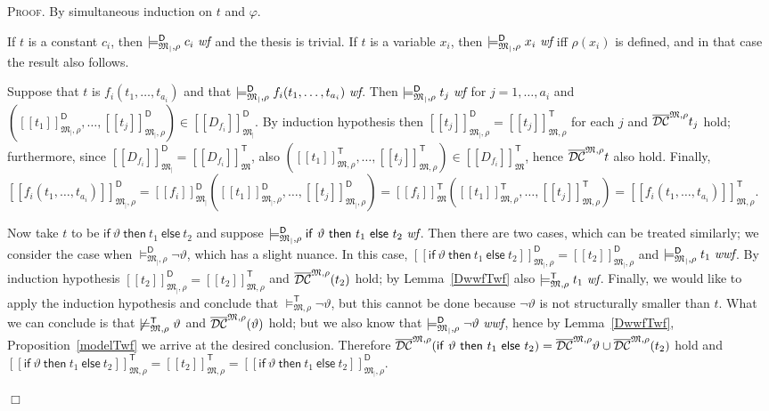 \documentclass{article}
\newenvironment{proof}{\smallskip\textsc{Proof.}}{\hspace*{\fill}$\Box$}
\newcommand{\ifthelse}[3]{\ensuremath{\mathsf{if}\ {#1}\ \mathsf{then}\ {#2}\ \mathsf{else}\ {#3}}}
\newcommand{\restrfun}[1]{\ensuremath{{#1}_|}}
\newcommand{\wf}{\ \mbox{\em wf}}
\newcommand{\wwf}{\ \mbox{\em wwf}}
\newcommand{\intm}[3]{\ensuremath{[\![{#3}]\!]^{\mathsf{#1}}_{\mathfrak{#2}}}}
\newcommand{\ints}[4]{\ensuremath{[\![{#4}]\!]^{\mathsf{#1}}_{\mathfrak{#2},{#3}}}}
\newcommand{\mymodelss}[3]{\ensuremath{\models_{\mathfrak{#2},{#3}}^{\mathsf{#1}}}}
\newcommand{\semDC}[2][{\mathfrak M},\rho]{\ensuremath{\overline{\cal{DC}}^{#1}_{#2}}}
\begin{document}
\begin{proof}
By simultaneous induction on $t$ and $\varphi$.

If $t$ is a constant $c_i$, then $\mymodelss{D}{\restrfun M}\rho{c_i}\wf$
and the thesis is trivial.
If $t$ is a variable $x_i$, then $\mymodelss{D}{\restrfun M}\rho{x_i}\wf$
iff $\rho(x_i)$ is defined, and in that case the result also follows.

Suppose that $t$ is $f_i(t_1,\ldots,t_{a_i})$ and that
$\mymodelss{D}{\restrfun M}\rho{f_i(t_1,\ldots,t_{a_i})}\wf$.  Then
$\mymodelss{D}{\restrfun M}\rho{t_j}\wf$ for $j=1,\ldots,a_i$ and
$(\ints{D}{\restrfun M}\rho{t_1},\ldots,\ints{D}{\restrfun M}\rho{t_j})%
\in\intm{D}{\restrfun M}{D_{f_i}}$.
By induction hypothesis then
$\ints{D}{\restrfun M}\rho{t_j}=\ints{T}M\rho{t_j}$ for each $j$
and $\semDC{}{t_j}$ hold; furthermore, since
$\intm{D}{\restrfun M}{D_{f_i}}=\intm{T}M{D_{f_i}}$, also
$(\ints{T}M\rho{t_1},\ldots,\ints{T}M\rho{t_j})\in\intm{T}M{D_{f_i}}$,
hence $\semDC{}{t}$ also hold.  Finally,
$\ints{D}{\restrfun M}\rho{f_i(t_1,\ldots,t_{a_i})}=%
\intm{D}{\restrfun M}{f_i}(\ints{D}{\restrfun M}\rho{t_1},\ldots,\ints{D}{\restrfun M}\rho{t_j})=%
\intm{T}M{f_i}(\ints{T}M\rho{t_1},\ldots,\ints{T}M\rho{t_j})=%
\ints{T}M\rho{f_i(t_1,\ldots,t_{a_i})}$.

Now take $t$ to be $\ifthelse\vartheta{t_1}{t_2}$ and suppose
$\mymodelss{D}{\restrfun M}\rho{\ifthelse\vartheta{t_1}{t_2}}\wf$.
Then there are two cases, which can be treated similarly; we consider
the case when $\mymodelss{D}{\restrfun M}\rho\neg\vartheta$, which has
a slight nuance.  In this case,
$\ints{D}{\restrfun M}\rho{\ifthelse\vartheta{t_1}{t_2}}=\ints{D}{\restrfun M}\rho{t_2}$
and $\mymodelss{D}{\restrfun M}\rho t_1\wwf$.
By induction hypothesis $\ints{D}{\restrfun M}\rho{t_2}=\ints{T}M\rho{t_2}$
and $\semDC{}(t_2)$ hold; by Lemma~\ref{DwwfTwf} also
$\mymodelss{T}M\rho t_1\wf$.
Finally, we would like to apply the induction hypothesis and conclude
that $\mymodelss{T}M\rho\neg\vartheta$, but this cannot be done
because $\neg\vartheta$ is not structurally smaller than $t$.  What we
can conclude is that $\not\mymodelss{T}M\rho\vartheta$ and
$\semDC{}(\vartheta)$ hold; but we also know that
$\mymodelss{D}{\restrfun M}\rho\neg\vartheta\wwf$, hence by
Lemma~\ref{DwwfTwf}, Proposition~\ref{modelTwf} we arrive at the
desired conclusion.
Therefore $\semDC{}(\ifthelse\vartheta{t_1}{t_2})=%
\semDC{}\vartheta\cup\semDC{}(t_2)$ hold and
$\ints{T}M\rho{\ifthelse\vartheta{t_1}{t_2}}=\ints{T}M\rho{t_2}=%
\ints{D}{\restrfun M}\rho{\ifthelse\vartheta{t_1}{t_2}}$.


\end{proof}
\end{document}
